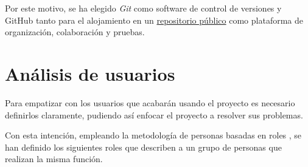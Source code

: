Por este motivo, se ha elegido \textit{Git} como software de control de versiones y GitHub tanto para el alojamiento en un \href{https://github.com/dipzza/ultrastar-song2txt}{repositorio público} como plataforma de organización, colaboración y pruebas.

\section{Análisis de usuarios}

Para empatizar con los usuarios que acabarán usando el proyecto es necesario definirlos claramente, pudiendo así enfocar el proyecto a resolver sus problemas.

Con esta intención, empleando la metodología de personas basadas en roles \cite{role-personas}, se han definido los siguientes roles que describen a un grupo de personas que realizan la misma función.

